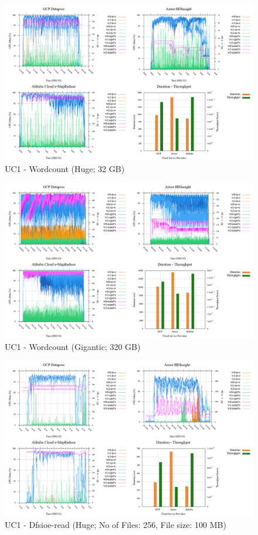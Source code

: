 \documentclass[review]{elsarticle}
\begin{document}
\begin{figure}[b]
	\caption{UC1 - Wordcount (Huge; 32 GB)}
	\label{fig:uc1-wrdcnt-h-cmidt}
	\includegraphics[width=\textwidth]{uc1-wrdcnt-h-cmidt}
	\centering
\end{figure}

\begin{figure}[b]
	\caption{UC1 - Wordcount (Gigantic; 320 GB)}
	\label{fig:uc1-wrdcnt-g-cmidt}
	\includegraphics[width=\textwidth]{uc1-wrdcnt-g-cmidt}
	\centering
\end{figure}

\begin{figure}[b]
	\caption{UC1 - Dfsioe-read (Huge; No of Files: 256, File size: 100 MB)}
	\label{fig:uc1-dfsioer-h-cmidt}
	\includegraphics[width=\textwidth]{uc1-dfsioer-h-cmidt}
	\centering
\end{figure}
\end{document}

